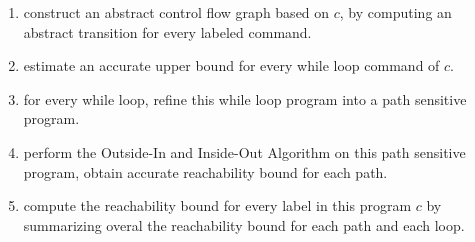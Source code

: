 \begin{enumerate}
\item  construct an abstract control flow graph based on $c$, by computing an abstract transition 
for every labeled command.
\item estimate an accurate upper bound for every while loop command of $c$.
\item for every while loop, refine this while loop program into a path sensitive program.
\item perform the Outside-In and Inside-Out Algorithm on this path sensitive program, obtain 
accurate reachability bound for each path.
\item compute the reachability bound for every label in this program $c$ by summarizing overal the reachability bound for
each path and each loop.
\end{enumerate}

